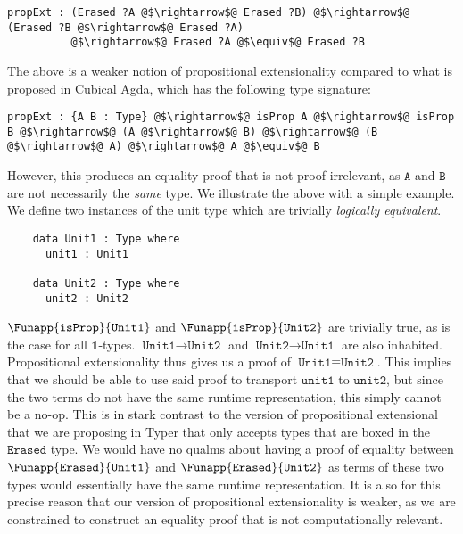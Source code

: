 \documentclass[12pt,twoside,maitrise]{dms}
\theoremstyle{definition}
\numberwithin{equation}{section}
\numberwithin{table}{chapter}
\numberwithin{figure}{chapter}
\newcommand\id[1] {\texttt{#1}}
\begin{document}
\begin{verbatim}
propExt : (Erased ?A @$\rightarrow$@ Erased ?B) @$\rightarrow$@ (Erased ?B @$\rightarrow$@ Erased ?A)
          @$\rightarrow$@ Erased ?A @$\equiv$@ Erased ?B
\end{verbatim}

The above is a weaker notion of propositional extensionality compared to what is
proposed in Cubical Agda, which has the following type signature:

\begin{verbatim}
propExt : {A B : Type} @$\rightarrow$@ isProp A @$\rightarrow$@ isProp B @$\rightarrow$@ (A @$\rightarrow$@ B) @$\rightarrow$@ (B @$\rightarrow$@ A) @$\rightarrow$@ A @$\equiv$@ B
\end{verbatim}

However, this produces an equality proof that is not proof irrelevant, as
$\id{A}$ and $\id{B}$ are not necessarily the \emph{same} type. We illustrate
the above with a simple example. We define two instances of the unit type which
are trivially \emph{logically equivalent}.

\begin{verbatim}
    data Unit1 : Type where
      unit1 : Unit1

    data Unit2 : Type where
      unit2 : Unit2
\end{verbatim}

$\Funapp{\id{isProp}}{\id{Unit1}}$ and $\Funapp{\id{isProp}}{\id{Unit2}}$ are
trivially true, as is the case for all $\mathbb{1}$-types. $\id{Unit1}
\rightarrow \id{Unit2}$ and $\id{Unit2} \rightarrow \id{Unit1}$ are also
inhabited. Propositional extensionality thus gives us a proof of $\id{Unit1}
\equiv \id{Unit2}$. This implies that we should be able to use said proof to
transport $\id{unit1}$ to $\id{unit2}$, but since the two terms do not have the
same runtime representation, this simply cannot be a no-op. This is in stark
contrast to the version of propositional extensional that we are proposing in
Typer that only accepts types that are boxed in the $\id{Erased}$ type. We would
have no qualms about having a proof of equality between
$\Funapp{\id{Erased}}{\id{Unit1}}$ and $\Funapp{\id{Erased}}{\id{Unit2}}$ as
terms of these two types would essentially have the same runtime representation.
It is also for this precise reason that our version of propositional
extensionality is weaker, as we are constrained to construct an equality proof
that is not computationally relevant.
\end{document}
